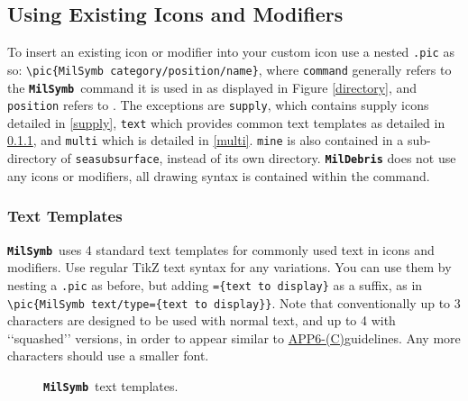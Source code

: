 \documentclass[a4paper, titlepage]{article}
\newcommand\MilSymb{\textbf{\texttt{MilSymb}}}
\newcommand\DocLink{\href{https://www.awl.edu.pl/images/en/APP_6_C.pdf}{APP6-(C)}}
\begin{document}
\subsection{Using Existing Icons and Modifiers}

To insert an existing icon or modifier into your custom icon use a nested \texttt{.pic} as so: \texttt{\textbackslash pic\{MilSymb category/position/name\}}, where \texttt{command} generally refers to the \MilSymb\  command it is used in as displayed in Figure \ref{directory}, and \texttt{position} refers to . The exceptions are \texttt{supply}, which contains supply icons detailed in \ref{supply}, \texttt{text} which provides common text templates as detailed in \ref{text}, and \texttt{multi} which is detailed in \ref{multi}. \texttt{mine} is also contained in a sub-directory of \texttt{seasubsurface}, instead of its own directory. \texttt{\textbf{MilDebris}} does not use any icons or modifiers, all drawing syntax is contained within the command.

\subsubsection{Text Templates}
\label{text}

\MilSymb\  uses 4 standard text templates for commonly used text in icons and modifiers. Use regular TikZ text syntax for any variations. You can use them by nesting a \texttt{.pic} as before, but adding \texttt{=\{text to display\}} as a suffix, as in \texttt{\textbackslash pic\{MilSymb text/type=\{text to display\}\}}. Note that conventionally up to 3 characters are designed to be used with normal text, and up to 4 with \lq\lq{}squashed\rq\rq{} versions, in order to appear similar to \DocLink guidelines. Any more characters should use a smaller font.

\begin{figure}[H]
\centering
{}
\caption{\MilSymb\  text templates.}
\end{figure}
\end{document}
